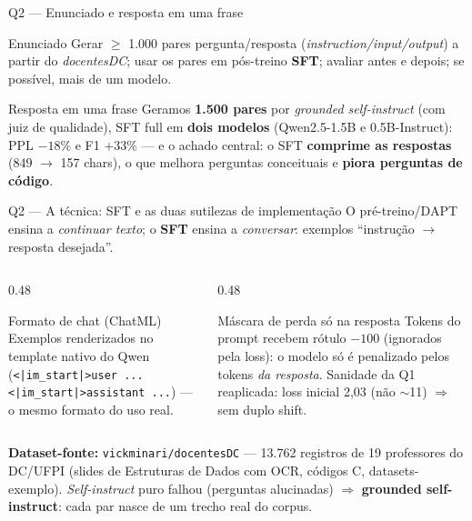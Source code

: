 \documentclass[10pt,aspectratio=169]{beamer}
\newcommand{\ganho}[1]{\textcolor{okgreen}{\textbf{#1}}}
\newcommand{\ruim}[1]{\textcolor{warnred}{\textbf{#1}}}
\begin{document}
\begin{frame}{Q2 — Enunciado e resposta em uma frase}
  \begin{block}{Enunciado}
    Gerar $\geq$ 1.000 pares pergunta/resposta (\emph{instruction/input/output}) a partir do
    \emph{docentesDC}; usar os pares em pós-treino \textbf{SFT}; avaliar antes e depois;
    se possível, mais de um modelo.
  \end{block}
  \vspace{4pt}
  \begin{alertblock}{Resposta em uma frase}
    Geramos \textbf{1.500 pares} por \emph{grounded self-instruct} (com juiz de qualidade), SFT full em
    \textbf{dois modelos} (Qwen2.5-1.5B e 0.5B-Instruct): PPL \ganho{$-18\%$} e F1 \ganho{$+33\%$} —
    e o achado central: o SFT \textbf{comprime as respostas} (849 $\to$ 157 chars), o que melhora
    perguntas conceituais e \ruim{piora perguntas de código}.
  \end{alertblock}
\end{frame}

\begin{frame}{Q2 — A técnica: SFT e as duas sutilezas de implementação}
  O pré-treino/DAPT ensina a \emph{continuar texto}; o \textbf{SFT} ensina a \emph{conversar}:
  exemplos ``instrução $\to$ resposta desejada''.
  \vspace{6pt}
  \begin{columns}[T]
    \begin{column}{0.48\textwidth}
      \begin{block}{Formato de chat (ChatML)}
        \small Exemplos renderizados no template nativo do Qwen
        (\texttt{<|im\_start|>user ... <|im\_start|>assistant ...}) —
        o mesmo formato do uso real.
      \end{block}
    \end{column}
    \begin{column}{0.48\textwidth}
      \begin{block}{Máscara de perda só na resposta}
        \small Tokens do prompt recebem rótulo $-100$ (ignorados pela loss): o modelo só é penalizado
        pelos tokens \emph{da resposta}. Sanidade da Q1 reaplicada: loss inicial 2,03 (não $\sim$11)
        $\Rightarrow$ sem duplo shift.
      \end{block}
    \end{column}
  \end{columns}
  \vspace{6pt}
  \small \textbf{Dataset-fonte:} \texttt{vickminari/docentesDC} — 13.762 registros de 19 professores do
  DC/UFPI (slides de Estruturas de Dados com OCR, códigos C, datasets-exemplo).
  \emph{Self-instruct} puro falhou (perguntas alucinadas) $\Rightarrow$
  \textbf{grounded self-instruct}: cada par nasce de um trecho real do corpus.
\end{frame}
\end{document}
